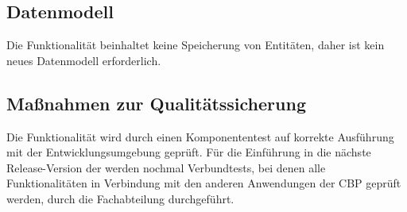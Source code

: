 \subsection{Datenmodell}
\label{sec:Datenmodell}

Die Funktionalität \gqq{\titel} beinhaltet keine Speicherung von Entitäten, daher ist kein neues Datenmodell erforderlich.


\subsection{Maßnahmen zur Qualitätssicherung}
\label{sec:Qualitaetssicherung}

Die Funktionalität  wird durch einen Komponententest auf korrekte Ausführung mit der Entwicklungsumgebung geprüft. Für die Einführung in die nächste Release-Version der \CBPAD werden nochmal Verbundtests, bei denen alle Funktionalitäten in Verbindung mit den anderen Anwendungen der \acs{CBP}\xspace geprüft werden, durch die Fachabteilung durchgeführt.


